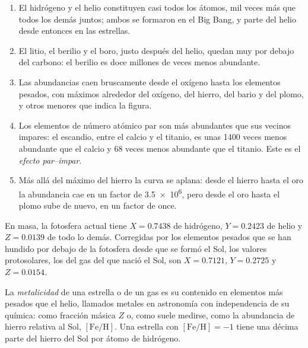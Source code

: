 
\begin{enumerate}
\item El hidrógeno y el helio constituyen casi todos los átomos, mil veces
  más que todos los demás juntos; ambos se formaron en el Big Bang, y
  parte del helio desde entonces en las estrellas.
\item El litio, el berilio y el boro, justo después del helio, quedan muy por debajo
  del carbono: el berilio es doce millones de veces menos abundante.
\item Las abundancias caen bruscamente desde el oxígeno hasta los elementos pesados, con
  máximos alrededor del oxígeno, del hierro, del bario y del plomo, y
  otros menores que indica la figura.
\item Los elementos de número atómico par son más abundantes que sus vecinos impares:
  el escandio, entre el calcio y el titanio, es unas \num{1400}
  veces menos abundante que el calcio y \num{68} veces menos abundante que el titanio. Este
  es el \emph{efecto par--impar}.
\item Más allá del máximo del hierro la curva se aplana: desde el hierro hasta el oro la
  abundancia cae en un factor de \num{3.5e6}, pero desde el oro hasta el plomo sube
  de nuevo, en un factor de once.
\end{enumerate}

En masa, la fotosfera actual tiene $X = 0.7438$ de hidrógeno,
$Y = 0.2423$ de helio y $Z = 0.0139$ de todo lo demás. Corregidas por
los elementos pesados que se han hundido por debajo de la fotosfera desde que se formó el Sol,
los valores protosolares, los del gas del que nació el Sol,
son $X = 0.7121$, $Y = 0.2725$ y $Z = 0.0154$.

\begin{definition}[Metalicidad]\label{def:b3:origin-of-elements:metallicity}
La \emph{metalicidad} de una estrella o de un gas es su
contenido en elementos más pesados que el helio, llamados metales en astronomía
con independencia de su química: como fracción másica $Z$ o, como suele medirse,
como la abundancia de hierro relativa al Sol, $[\mathrm{Fe/H}]$.
Una estrella con $[\mathrm{Fe/H}] = -1$ tiene una décima parte del hierro del Sol por
átomo de hidrógeno.
\end{definition}

